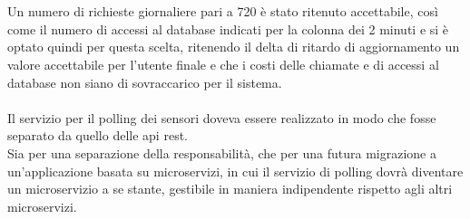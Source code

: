 \\\\
Un numero di richieste giornaliere pari a 720 è stato ritenuto accettabile, così come il numero di accessi al database
indicati per la colonna dei 2 minuti e si è optato quindi per questa scelta, ritenendo il delta di ritardo di
aggiornamento un valore accettabile per l'utente finale e che i costi delle chiamate e di accessi al database non
siano di sovraccarico per il sistema.
\\\\
Il servizio per il polling dei sensori doveva essere realizzato in modo che fosse separato da quello delle \gls{api} \gls{rest}.
\\
Sia per una separazione della responsabilità, che per una futura migrazione a un'applicazione basata su microservizi,
in cui il servizio di polling dovrà diventare un microservizio a se stante, gestibile in maniera indipendente rispetto
agli altri microservizi.

